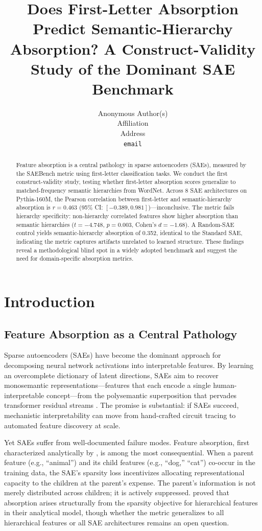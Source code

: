 \documentclass{article}
\title{Does First-Letter Absorption Predict Semantic-Hierarchy Absorption? A Construct-Validity Study of the Dominant SAE Benchmark}
\author{%
  Anonymous Author(s) \\
  Affiliation \\
  Address \\
  \texttt{email} \\
}
\begin{document}
\maketitle

\begin{abstract}
Feature absorption is a central pathology in sparse autoencoders (SAEs), measured by the SAEBench metric using first-letter classification tasks. We conduct the first construct-validity study, testing whether first-letter absorption scores generalize to matched-frequency semantic hierarchies from WordNet. Across 8 SAE architectures on Pythia-160M, the Pearson correlation between first-letter and semantic-hierarchy absorption is $r = 0.463$ (95\% CI: $[-0.389, 0.981]$)---inconclusive. The metric fails hierarchy specificity: non-hierarchy correlated features show higher absorption than semantic hierarchies ($t = -4.748$, $p = 0.003$, Cohen's $d = -1.68$). A Random-SAE control yields semantic-hierarchy absorption of 0.352, identical to the Standard SAE, indicating the metric captures artifacts unrelated to learned structure. These findings reveal a methodological blind spot in a widely adopted benchmark and suggest the need for domain-specific absorption metrics.
\end{abstract}

\section{Introduction}

\subsection{Feature Absorption as a Central Pathology}

Sparse autoencoders (SAEs) have become the dominant approach for decomposing neural network activations into interpretable features. By learning an overcomplete dictionary of latent directions, SAEs aim to recover monosemantic representations---features that each encode a single human-interpretable concept---from the polysemantic superposition that pervades transformer residual streams \citep{bricken2023monosemanticity, cunningham2023sparse}. The promise is substantial: if SAEs succeed, mechanistic interpretability can move from hand-crafted circuit tracing to automated feature discovery at scale.

Yet SAEs suffer from well-documented failure modes. Feature absorption, first characterized analytically by \citet{chanin2024feature}, is among the most consequential. When a parent feature (e.g., ``animal'') and its child features (e.g., ``dog,'' ``cat'') co-occur in the training data, the SAE's sparsity loss incentivizes allocating representational capacity to the children at the parent's expense. The parent's information is not merely distributed across children; it is actively suppressed. \citet{chanin2024feature} proved that absorption arises structurally from the sparsity objective for hierarchical features in their analytical model, though whether the metric generalizes to all hierarchical features or all SAE architectures remains an open question.
\end{document}
